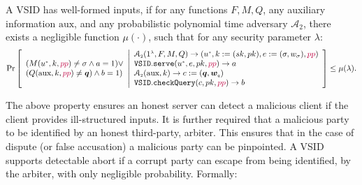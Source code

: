 \begin{definition}\label{deff::VSID-Inputs-Well-formedess}  A  VSID  has  well-formed inputs,   if for any  functions $F,M,Q$,  any auxiliary information $\text{aux}$, and  any probabilistic polynomial time adversary $\mathcal{A}_{\scriptscriptstyle 2}$, there exists a negligible function $\mu(\cdot)$, such that for any security parameter $\lambda$: 
\small{
$$ \Pr\left[
  \begin{array}{l}
  (M(u^{\scriptscriptstyle *},k,{\color{purple}pp})\neq \sigma \wedge a=1) \vee\\ (Q(\text{aux},k,{\color{purple}pp})\neq \bm{q}) \wedge  b=1)\\
\end{array} \middle |
    \begin{array}{l}
    
    \mathcal{A}_{\scriptscriptstyle 2}(1^{\scriptscriptstyle\lambda},F,M,Q)\rightarrow (u^{\scriptscriptstyle *},k:=(sk,pk),e:=(\sigma,w_{\sigma}),{\color{purple}pp})\\
    \mathtt{VSID.serve}(u^{\scriptscriptstyle *},e,pk,{\color{purple}pp})\rightarrow a\\
       \mathcal{A}_{\scriptscriptstyle 2}(\text{aux},k)\rightarrow c:=(\bm{q},\bm{w}_{\scriptscriptstyle q})\\
    \mathtt{VSID.checkQuery}(c, pk,{\color{purple}pp})\rightarrow b\\
\end{array}    \right]\leq \mu(\lambda).$$
}

\end{definition}

The   above property ensures an honest server can detect  a malicious client if the client provides ill-structured inputs. It is further required that a malicious party to be identified by an honest third-party, arbiter. This ensures that in the case of dispute (or false accusation) a malicious party can be pinpointed. A VSID supports  detectable abort if a corrupt party can escape from being identified, by the arbiter,  with only negligible probability.  Formally:


